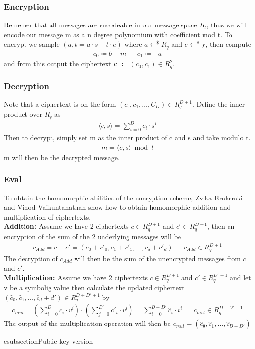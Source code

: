 \documentclass[../main.tex]{subfiles}
\begin{document}
    \subsubsection{Encryption}
    Rememer that all messages are encodeable in our message space $R_t$, thus we will encode our message m as a n degree
    polynomium with coefficient mod t.
    To encrypt we sample $(a, b = a \cdot s + t \cdot e)$ where $a \leftarrow^\$ R_q$ and $e \leftarrow^\$ \chi$,
    then compute
    \begin{align*}
        c_0 \coloneqq b + m && c_1 \coloneqq -a
    \end{align*}
    and from this output the ciphertext \textbf{c} $\coloneqq (c_0, c_1) \in R_q^2$.

    \subsubsection{Decryption}
    Note that a ciphertext is on the form $(c_0, c_1, \dots , C_{D}) \in R_q^{D+1}$.
    Define the inner product over $R_q$ as
    \begin{align*}
        \langle c, s \rangle = \sum_{i=0}^{D} c_i \cdot s^i
    \end{align*}
    Then to decrypt, simply set m as the inner product of c and s and take modulo t.
    \begin{align*}
        m = \langle c, s \rangle \bmod t
    \end{align*}
    m will then be the decrypted message.

    \subsubsection{Eval}
    To obtain the homomorphic abilities of the encryption scheme, Zvika Brakerski and Vinod Vaikuntanathan show
    how to obtain homomorphic addition and multiplication of ciphertexts.
    \\[2mm]
    \textbf{Addition:} Assume we have 2 ciphertexts $c \in R_q^{D+1}$ and $c' \in R_q^{D+1}$, then an encryption
    of the sum of the 2 underlying messages will be
    \begin{align*}
        c_{Add} = c + c' = (c_0 + c'_0, c_1 + c'_1, \dots , c_d + c'_d) && c_{Add} \in R_q^{D + 1}
    \end{align*}
    The decryption of $c_{Add}$ will then be the sum of the unencrypted messages from $c$ and $c'$.
    \\[2mm]
    \textbf{Multiplication:} Assume we have 2 ciphertexts $c \in R_q^{D+1}$ and $c' \in R_q^{D'+1}$ and let v be a symbolig value
    then calculate the updated ciphertext
    \\
    $(\hat{c}_0, \hat{c}_1, \dots, \hat{c}_d+d') \in R_q^{D + D' + 1}$ by
    \begin{align*}
        c_{mul} = (\sum_{i=0}^D c_i \cdot v^i) \cdot
                  (\sum_{j=0}^{D'} c'_i \cdot v^i) =
                   \sum_{i=0}^{D+D'} \hat{c}_i \cdot v^i
            && c_{mul} \in R_q^{D+D'+1}
    \end{align*}
    The output of the multiplication operation will then be $c_{mul} = (\hat{c}_0, \hat{c}_1, \dots, \hat{c}_{D+D'})$
    
    esubsection{Public key version}
\end{document}
